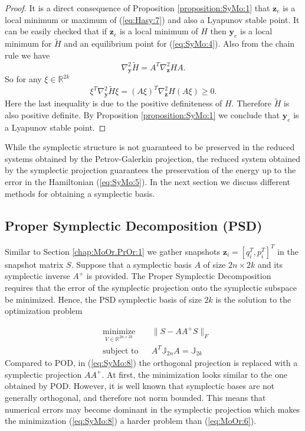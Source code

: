 \documentclass[final]{siamart}
\begin{document}
{\begin{proof}
	It is a direct consequence of Proposition \ref{proposition:SyMo:1} that $\mathbf z_e$ is a local minimum or maximum of (\ref{eq:Hasy:7}) and also a Lyapunov stable point. It can be easily checked that if $\mathbf z_e$ is a local minimum of $H$ then $\mathbf y_e$ is a local minimum for $\tilde H$ and an equilibrium point for (\ref{eq:SyMo:4}). Also from the chain rule we have
\[
	\nabla^2_{\mathbf y} \tilde H = A^T \nabla^2_{\mathbf z} H A.
\]
So for any $\xi\in \mathbb R^{2k}$
\[
	\xi^T \nabla^2_{\mathbf y} \tilde H \xi = (A\xi)^T \nabla^2_{\mathbf z} H (A\xi) \geq 0.
\]
Here the last inequality is due to the positive definiteness of $H$. Therefore $\tilde H$ is also positive definite. By Proposition \ref{proposition:SyMo:1} we conclude that $\mathbf y_e$ is a Lyapunov stable point.
\end{proof}
}

While the symplectic structure is not guaranteed to be preserved in the reduced systems obtained by the Petrov-Galerkin projection, the reduced system obtained by the symplectic projection guarantees the preservation of the energy up to the error in the Hamiltonian (\ref{eq:SyMo:5}). In the next section we discuss  different methods for obtaining a symplectic basis.

\subsection{Proper Symplectic Decomposition (PSD)} \label{chap:SyMo.PrSy:1}

Similar to Section \ref{chap:MoOr.PrOr:1} we gather snapshots $\mathbf z_i = [q_i^T , p_i^T]^T$ in the snapshot matrix $S$. Suppose that a symplectic basis $A$ of size $2n\times2k$ and its symplectic inverse $A^+$ is provided. {{\color{black}} The Proper Symplectic Decomposition} requires that the error of the symplectic projection onto the symplectic subspace {{\color{black}} be minimized}. Hence, the PSD symplectic basis of size $2k$ is the solution to the optimization problem

\begin{equation} \label{eq:SyMo:8}
\begin{aligned}
& \underset{V\in \mathbb R^{2n\times 2k}}{\text{minimize}}
& & \| S - AA^+S\|_F \\
& \text{subject to}
& & A^T \mathbb{J}_{2n}A = \mathbb{J}_{2k}
\end{aligned}
\end{equation}
Compared to POD, in (\ref{eq:SyMo:8}) the orthogonal projection is replaced with a symplectic projection $AA^+$. At first, the minimization looks similar to the one obtained by POD. {{\color{black}} However, it is well known that symplectic bases are not generally orthogonal, and therefore not norm bounded. This means that numerical errors may become dominant in the symplectic projection \cite{Karow:2006cf} which makes the minimization (\ref{eq:SyMo:8}) a harder problem than (\ref{eq:MoOr:6}).}
	
\end{document}
